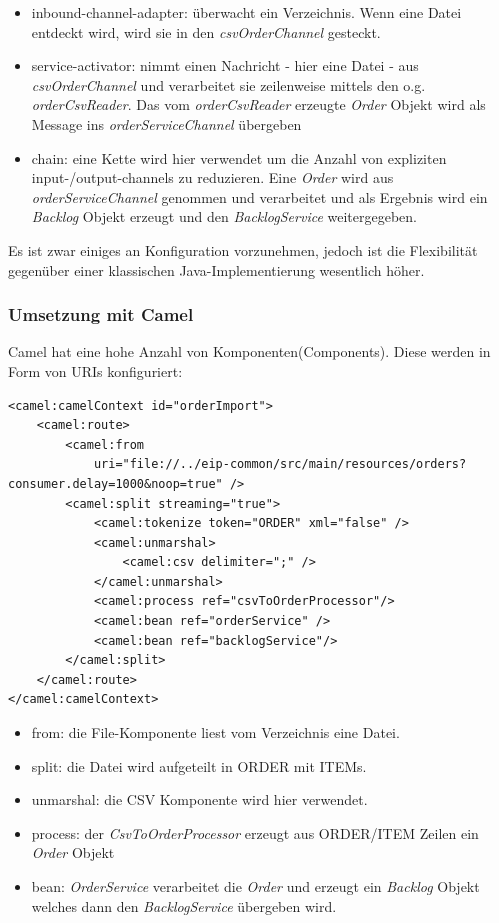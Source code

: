 \documentclass[12pt,a4paper,ngerman]{article}
\begin{document}
\begin{itemize}
\item
  inbound-channel-adapter: überwacht ein Verzeichnis. Wenn eine Datei
  entdeckt wird, wird sie in den \emph{csvOrderChannel} gesteckt.
\item
  service-activator: nimmt einen Nachricht - hier eine Datei - aus
  \emph{csvOrderChannel} und verarbeitet sie zeilenweise mittels den
  o.g. \emph{orderCsvReader}. Das vom \emph{orderCsvReader} erzeugte
  \emph{Order} Objekt wird als Message ins \emph{orderServiceChannel}
  übergeben
\item
  chain: eine Kette wird hier verwendet um die Anzahl von expliziten
  input-/output-channels zu reduzieren. Eine \emph{Order} wird aus
  \emph{orderServiceChannel} genommen und verarbeitet und als Ergebnis
  wird ein \emph{Backlog} Objekt erzeugt und den \emph{BacklogService}
  weitergegeben.
\end{itemize}

Es ist zwar einiges an Konfiguration vorzunehmen, jedoch ist die
Flexibilität gegenüber einer klassischen Java-Implementierung wesentlich
höher.

\subsubsection{Umsetzung mit Camel}

Camel hat eine hohe Anzahl von Komponenten(Components). Diese werden in
Form von URIs konfiguriert:

\begin{lstlisting}
<camel:camelContext id="orderImport">
    <camel:route>
        <camel:from
            uri="file://../eip-common/src/main/resources/orders?consumer.delay=1000&noop=true" />
        <camel:split streaming="true">
            <camel:tokenize token="ORDER" xml="false" />
            <camel:unmarshal>
                <camel:csv delimiter=";" />
            </camel:unmarshal>
            <camel:process ref="csvToOrderProcessor"/>
            <camel:bean ref="orderService" />
            <camel:bean ref="backlogService"/>
        </camel:split>
    </camel:route>
</camel:camelContext>
\end{lstlisting}

\begin{itemize}
\item
  from: die File-Komponente liest vom Verzeichnis eine Datei.
\item
  split: die Datei wird aufgeteilt in ORDER mit ITEMs.
\item
  unmarshal: die CSV Komponente wird hier verwendet.
\item
  process: der \emph{CsvToOrderProcessor} erzeugt aus ORDER/ITEM Zeilen
  ein \emph{Order} Objekt
\item
  bean: \emph{OrderService} verarbeitet die \emph{Order} und erzeugt ein
  \emph{Backlog} Objekt welches dann den \emph{BacklogService} übergeben
  wird.
\end{itemize}
\end{document}
